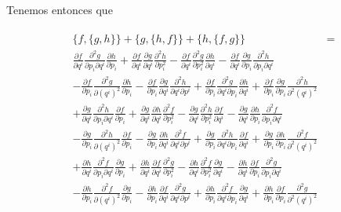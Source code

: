 \documentclass[a4paper,10pt]{article}
\numberwithin{equation}{section}
\begin{document}
Tenemos entonces que 

\begin{align}
\begin{split}
  \{f,\{g,h\}\} + \{g,\{h,f\}\} + \{h,\{f,g\}\} &= \\
 \frac{\partial f}{\partial q^i}
  \frac{\partial^2 g}{\partial p_i\partial q^i}\frac{\partial h}{\partial p_i} 
  + \frac{\partial f}{\partial q^i}
  \frac{\partial g}{\partial q^i}\frac{\partial^2 h}{\partial p_i^2} 
  -\frac{\partial f}{\partial q^i}
  \frac{\partial^2 g}{\partial p_i^2}\frac{\partial h}{\partial q^i} 
  -\frac{\partial f}{\partial q^i} 
  \frac{\partial g}{\partial p_i}\frac{\partial^2 h}{\partial p_i \partial q^i} \\
  - \frac{\partial f}{\partial p_i}\frac{\partial^2 g}{\partial (q^i)^2}
  \frac{\partial h}{\partial p_i} - \frac{\partial f}{\partial p_i}\frac{\partial g}{\partial q^i}
  \frac{\partial^2 h}{\partial q^i\partial p^i} + \frac{\partial f}{\partial p_i}\frac{\partial^2 g}{\partial q^i\partial p_i}
  \frac{\partial h}{\partial q^i} + \frac{\partial f}{\partial p_i}\frac{\partial g}{\partial p_i}
  \frac{\partial^2 h}{\partial^2(q^i)^2} \\
  + \frac{\partial g}{\partial q^i}
  \frac{\partial^2 h}{\partial p_i\partial q^i}\frac{\partial f}{\partial p_i} 
  + \frac{\partial g}{\partial q^i}
  \frac{\partial h}{\partial q^i}\frac{\partial^2 f}{\partial p_i^2} 
  -\frac{\partial g}{\partial q^i}
  \frac{\partial^2 h}{\partial p_i^2}\frac{\partial f}{\partial q^i} 
  -\frac{\partial g}{\partial q^i} 
  \frac{\partial h}{\partial p_i}\frac{\partial^2 f}{\partial p_i \partial q^i} \\
   - \frac{\partial g}{\partial p_i}\frac{\partial^2 h}{\partial (q^i)^2}
  \frac{\partial f}{\partial p_i} - \frac{\partial g}{\partial p_i}\frac{\partial h}{\partial q^i}
  \frac{\partial^2 f}{\partial q^i\partial p^i} + \frac{\partial g}{\partial p_i}\frac{\partial^2 h}{\partial q^i\partial p_i}
  \frac{\partial f}{\partial q^i} + \frac{\partial g}{\partial p_i}\frac{\partial h}{\partial p_i}
  \frac{\partial^2 f}{\partial^2(q^i)^2} \\
  + \frac{\partial h}{\partial q^i}
  \frac{\partial^2 f}{\partial p_i\partial q^i}\frac{\partial g}{\partial p_i} 
  + \frac{\partial h}{\partial q^i}
  \frac{\partial f}{\partial q^i}\frac{\partial^2 g}{\partial p_i^2} 
  -\frac{\partial h}{\partial q^i}
  \frac{\partial^2 f}{\partial p_i^2}\frac{\partial g}{\partial q^i} 
  -\frac{\partial h}{\partial q^i} 
  \frac{\partial f}{\partial p_i}\frac{\partial^2 g}{\partial p_i \partial q^i} \\
  - \frac{\partial h}{\partial p_i}\frac{\partial^2 f}{\partial (q^i)^2}
  \frac{\partial g}{\partial p_i} - \frac{\partial h}{\partial p_i}\frac{\partial f}{\partial q^i}
  \frac{\partial^2 g}{\partial q^i\partial p^i} + \frac{\partial h}{\partial p_i}\frac{\partial^2 f}{\partial q^i\partial p_i}
  \frac{\partial g}{\partial q^i} + \frac{\partial h}{\partial p_i}\frac{\partial f}{\partial p_i}
  \frac{\partial^2 g}{\partial^2(q^i)^2}
\end{split}
\end{align}
\end{document}
